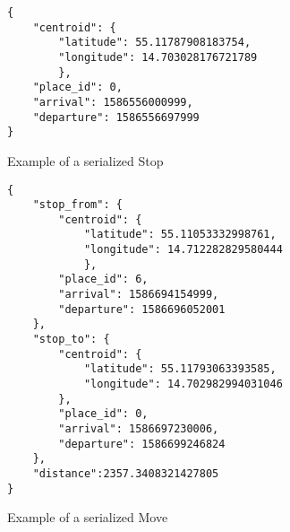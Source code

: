 \begin{figure}
    \centering
\begin{verbatim}
{
    "centroid": {
        "latitude": 55.11787908183754,
        "longitude": 14.703028176721789
        },
    "place_id": 0,
    "arrival": 1586556000999,
    "departure": 1586556697999
}
\end{verbatim}
    \caption{Example of a serialized Stop}
    \label{fig:serialized_stop}
\end{figure}

\begin{figure}
    \centering
\begin{verbatim}
{
    "stop_from": {
        "centroid": {
            "latitude": 55.11053332998761,
            "longitude": 14.712282829580444
            },
        "place_id": 6,
        "arrival": 1586694154999,
        "departure": 1586696052001
    },
    "stop_to": {
        "centroid": {
            "latitude": 55.11793063393585,
            "longitude": 14.702982994031046
        },
        "place_id": 0,
        "arrival": 1586697230006,
        "departure": 1586699246824
    },
    "distance":2357.3408321427805
}
\end{verbatim}
    \caption{Example of a serialized Move}
    \label{fig:serialized_move}
\end{figure}